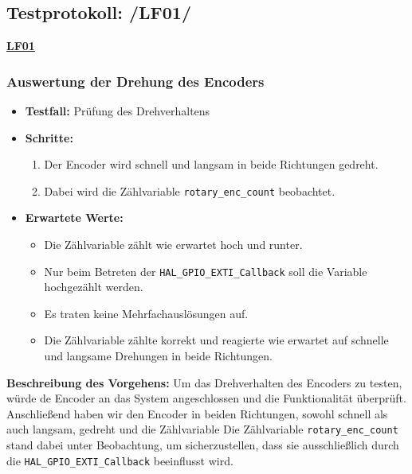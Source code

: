 \subsection{Testprotokoll: /LF01/}
\textbf{\hyperlink{LF01_Link}{LF01}} \\

\subsubsection{Auswertung der Drehung des Encoders}
\begin{itemize}
	\item \textbf{Testfall:} Prüfung des Drehverhaltens
	\item \textbf{Schritte:}
	\begin{enumerate}
		\item Der Encoder wird schnell und langsam in beide Richtungen gedreht.
		\item Dabei wird die Zählvariable \texttt{rotary\_enc\_count} beobachtet.
	\end{enumerate}
	\item \textbf{Erwartete Werte:}
	\begin{itemize}
		\item Die Zählvariable zählt wie erwartet hoch und runter.
		\item Nur beim Betreten der \texttt{HAL\_GPIO\_EXTI\_Callback} soll die Variable hochgezählt werden.
	\end{itemize}
	\begin{itemize}
		\item Es traten keine Mehrfachauslösungen auf.
		\item Die Zählvariable zählte korrekt und reagierte wie erwartet auf schnelle und langsame Drehungen in beide Richtungen.
	\end{itemize}
\end{itemize}




\textbf{Beschreibung des Vorgehens:}
Um das Drehverhalten des Encoders zu testen, würde de Encoder an das System angeschlossen und die Funktionalität überprüft. Anschließend haben wir den Encoder in beiden Richtungen, sowohl schnell als auch langsam, gedreht und die Zählvariable 
Die Zählvariable \texttt{rotary\_enc\_count} stand dabei unter Beobachtung, um sicherzustellen, dass sie ausschließlich durch die \texttt{HAL\_GPIO\_EXTI\_Callback} beeinflusst wird.


